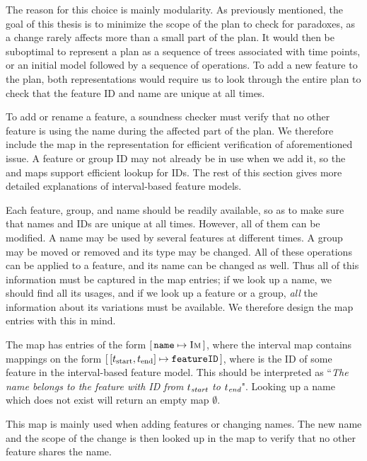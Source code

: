 The reason for this choice is mainly modularity. As previously mentioned, the goal of this thesis is to minimize the scope of the plan to check for paradoxes, as a change rarely affects more than a small part of the plan. It would then be suboptimal to represent a plan as a sequence of trees associated with time points, or an initial model followed by a sequence of operations. To add a new feature to the plan, both representations would require us to look through the entire plan to check that the feature ID and name are unique at all times.

To add or rename a feature, a soundness checker must verify that no other feature is using the name during the affected part of the plan. We therefore include the \names{} map in the representation for efficient verification of aforementioned issue. A feature or group ID may not already be in use when we add it, so the \features{} and \groups{} maps support efficient lookup for IDs. The rest of this section gives more detailed explanations of interval-based feature models.

Each feature, group, and name should be readily available, so as to make sure that names and IDs are unique at all times. However, all of them can be modified. A name may be used by several features at different times. A group may be moved or removed and its type may be changed. All of these operations can be applied to a feature, and its name can be changed as well. Thus all of this information must be captured in the map entries; if we look up a name, we should find all its usages, and if we look up a feature or a group, \emph{all} the information about its variations must be available. We therefore design the map entries with this in mind.

The \names{} map has entries of the form $[ \,\texttt{name} \mapsto \textsc{Im}\, ]$, where the interval map  contains mappings on the form $\intervalmapping{t_\text{start}}{t_\text{end}}{\var{featureID}}$, where  is the ID of some feature in the interval-based feature model. This should be interpreted as ``\emph{The name \emph{} belongs to the feature with ID \emph{} from $t_{\emph{\text{start}}}$ to $t_{\emph{\text{end}}}$}". Looking up a name which does not exist will return an empty map $\emptyset$. 

This map is mainly used when adding features or changing names. The new name and the scope of the change is then looked up in the \names{} map to verify that no other feature shares the name.


